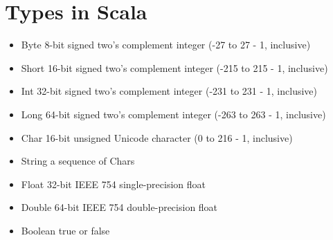 \documentclass[11pt,a4paper,oneside]{book}
\begin{document}
\chapter{Types in Scala}
\begin{itemize}
\itemsep-3pt
\item  Byte        8-bit signed two's complement integer (-27 to 27 - 1, inclusive)
\item  Short       16-bit signed two's complement integer (-215 to 215 - 1, inclusive)
\item Int         32-bit signed two's complement integer (-231 to 231 - 1, inclusive)        
\item Long        64-bit signed two's complement integer (-263 to 263 - 1, inclusive)
\item Char        16-bit unsigned Unicode character (0 to 216 - 1, inclusive)        
\item String        a sequence of Chars        
\item Float        32-bit IEEE 754 single-precision float        \item Double        64-bit IEEE 754 double-precision float        \item Boolean        true or false
\end{itemize} 
\end{document}
